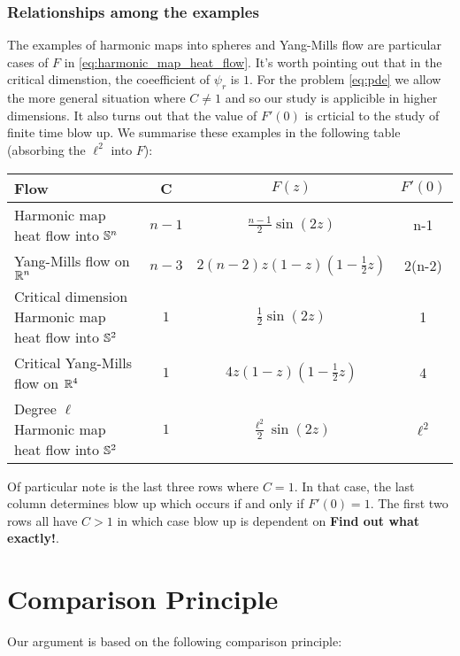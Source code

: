 \documentclass{amsart}
\begin{document}
\subsubsection*{Relationships among the examples}

The examples of harmonic maps into spheres and Yang-Mills flow are particular cases of \(F\) in \eqref{eq:harmonic_map_heat_flow}. It's worth pointing out that in the critical dimenstion, the coeefficient of \(\psi_r\) is \(1\). For the problem \eqref{eq:pde} we allow the more general situation where \(C \ne 1\) and so our study is applicible in higher dimensions. It also turns out that the value of \(F'(0)\) is crticial to the study of finite time blow up. We summarise these examples in the following table (absorbing the \(\ell^2\) into \(F\)):

\begin{center}
\begin{tabular}{ l | c | c | c}
Flow & C & \(F(z)\) & \(F'(0)\) \\
\hline
Harmonic map heat flow into \(\S^n\) & \(n-1\) & \(\tfrac{n-1}{2} \sin(2z)\) & n-1 \\
Yang-Mills flow on \(\R^n\) & \(n-3\) & \(2(n-2) z(1 - z)(1 - \tfrac{1}{2} z)\) & 2(n-2) \\
Critical dimension Harmonic map heat flow into \(\S^2\) & \(1\) & \(\tfrac{1}{2} \sin(2z)\) & 1 \\
Critical Yang-Mills flow on \(\R^4\) & \(1\) & \(4 z(1 - z)(1 - \tfrac{1}{2} z)\) & 4 \\
Degree \(\ell\) Harmonic map heat flow into \(\S^2\) & \(1\) & \(\tfrac{\ell^2}{2} \sin(2z)\) & \(\ell^2\)
\end{tabular}
\end{center}

Of particular note is the last three rows where \(C = 1\). In that case, the last column determines blow up which occurs if and only if \(F'(0) = 1\). The first two rows all have \(C > 1\) in which case blow up is dependent on \textbf{Find out what exactly!}.


\section{Comparison Principle}

Our argument is based on the following comparison principle:
\end{document}
